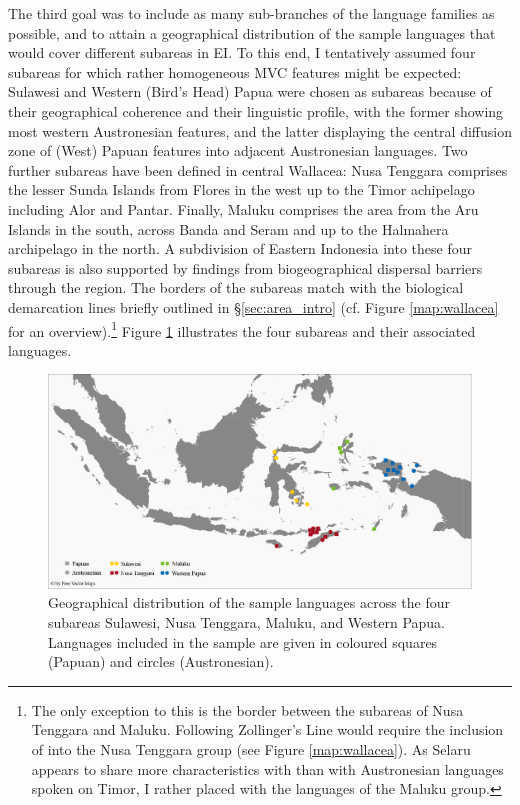 The third goal was to include as many sub-branches of the language families as possible, and to attain a geographical distribution of the sample languages that would cover different subareas in EI. To this end, I tentatively assumed four subareas for which rather homogeneous MVC features might be expected: Sulawesi and Western (Bird's Head) Papua were chosen as subareas because of their geographical coherence and their linguistic profile, with the former showing most western Austronesian features, and the latter displaying the central diffusion zone of (West) Papuan features into adjacent Austronesian languages. Two further subareas have been defined in central Wallacea: Nusa Tenggara comprises the lesser Sunda Islands from Flores in the west up to the Timor achipelago including Alor and Pantar. Finally, Maluku comprises the area from the Aru Islands in the south, across Banda and Seram and up to the Halmahera archipelago in the north. A subdivision of Eastern Indonesia into these four subareas is also supported by findings from biogeographical dispersal barriers through the region. The borders of the subareas match with the biological demarcation lines briefly outlined in §\ref{sec:area_intro} (cf. Figure \ref{map:wallacea} for an overview).\footnote{The only exception to this is the border between the subareas of Nusa Tenggara and Maluku. Following Zollinger's Line would require the inclusion of  into the Nusa Tenggara group (see Figure \ref{map:wallacea}). As Selaru appears to share more characteristics with  than with Austronesian languages spoken on Timor, I rather placed  with the languages of the Maluku group.} Figure \ref{map:subareas} illustrates the four subareas and their associated languages. 

\begin{figure}
\includegraphics[width=\columnwidth]{figures/Map_overview_klein_subareas.eps}
\caption[Geographical distribution of the sample languages across subareas]{Geographical distribution of the sample languages across the four subareas Sulawesi, Nusa Tenggara, Maluku, and Western Papua. Languages included in the sample are given in coloured squares (Papuan) and circles (Austronesian).}\label{map:subareas}
\end{figure}


